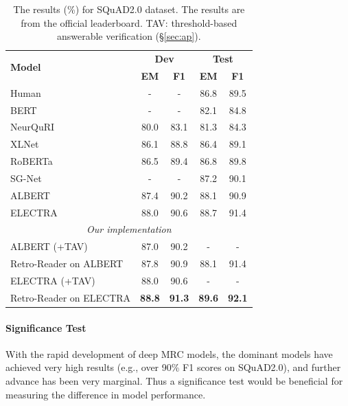 \documentclass[letterpaper]{article} %
\begin{document}
\begin{table}
	\centering
	\setlength{\tabcolsep}{5pt}
	{
		\begin{tabular}{l c c c c }
			\toprule
			\multirow{2}{*}{\textbf{Model} }& \multicolumn{2}{c}{\textbf{Dev}} & \multicolumn{2}{c}{\textbf{Test}}\\
			& \textbf{EM} & \textbf{F1}&   \textbf{EM} & \textbf{F1}\\
			\midrule
			Human& -  & - & 86.8&    89.5 \\
			\midrule
			BERT \cite{devlin2018bert} & -  & - &  82.1 &  84.8 \\
			NeurQuRI \cite{back2020neurquri} & 80.0  & 83.1 & 81.3  & 84.3 \\
			XLNet \cite{yang2019xlnet}& 86.1  & 88.8  & 86.4 &    89.1   \\
			RoBERTa \cite{liu2019roberta} & 86.5  & 89.4 &  86.8 &  89.8 \\
			SG-Net \cite{zhang2019sg} & -  & - & 87.2 &    90.1 \\
			ALBERT \cite{Lan2020ALBERT}& 87.4  & 90.2 & 88.1 &    90.9 \\
			ELECTRA \cite{clark2019electra} & 88.0 & 90.6 & 88.7 & 91.4 \\
			\midrule
			\multicolumn{5}{c}{\emph{Our implementation}} \\
			ALBERT (+TAV) & 87.0 & 90.2 & - & -\\
			Retro-Reader on ALBERT & 87.8 & 90.9 & 88.1 & 91.4 \\
			ELECTRA (+TAV) & 88.0 & 90.6  & -  & - \\
			Retro-Reader on ELECTRA & \textbf{88.8} & \textbf{91.3} & \textbf{89.6} & \textbf{92.1} \\
			\bottomrule
		\end{tabular}
	}
	\caption{\label{tab:squad2.0} The results (\%) for SQuAD2.0 dataset. The results  are from the official leaderboard.
	TAV: threshold-based answerable verification (\S\ref{sec:ap}).
	}
\end{table}

\paragraph{Significance Test} With the rapid development of deep MRC models, the dominant models have achieved very high results (e.g., over 90\% F1 scores on SQuAD2.0), and further advance has been very marginal. %
Thus a significance test would be beneficial for measuring the difference in model performance. %
\end{document}
